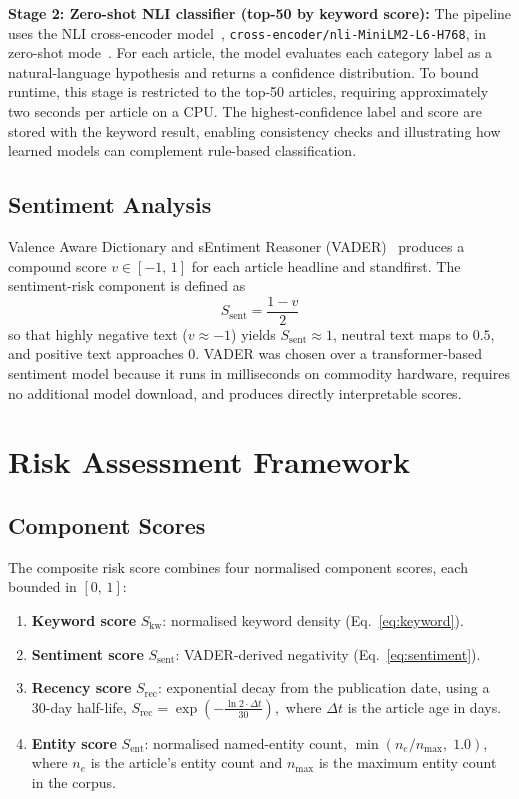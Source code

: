 \documentclass[12pt,lettersize,journal,onecolumn]{IEEEtran}
\begin{document}
\textbf{Stage 2: Zero-shot NLI classifier (top-50 by keyword score):} The pipeline uses the NLI cross-encoder model~\cite{reimers2019sentencebert}, \texttt{cross-encoder/nli-MiniLM2-L6-H768}, in zero-shot mode~\cite{yin2019benchmark}. For each article, the model evaluates each category label as a natural-language hypothesis and returns a confidence distribution. To bound runtime, this stage is restricted to the top-50 articles, requiring approximately two seconds per article on a CPU. The highest-confidence label and score are stored with the keyword result, enabling consistency checks and illustrating how learned models can complement rule-based classification.

\subsection{Sentiment Analysis}

Valence Aware Dictionary and sEntiment Reasoner (VADER)~\cite{hutto2014vader} produces a compound score $v \in [-1,\,1]$ for each article headline and standfirst. The sentiment-risk component is defined as
\begin{equation}
  S_{\mathrm{sent}} = \frac{1 - v}{2}
  \label{eq:sentiment}
\end{equation}
so that highly negative text ($v \approx -1$) yields $S_{\mathrm{sent}} \approx 1$, neutral text maps to $0.5$, and positive text approaches $0$. VADER was chosen over a transformer-based sentiment model because it runs in milliseconds on commodity hardware, requires no additional model download, and produces directly interpretable scores.

% 
\section{Risk Assessment Framework}
\label{sec:risk}
% 

\subsection{Component Scores}

The composite risk score combines four normalised component scores, each bounded in $[0,\,1]$:

\begin{enumerate}[leftmargin=*,noitemsep]
  \item \textbf{Keyword score} $S_{\mathrm{kw}}$: normalised keyword density (Eq.~\ref{eq:keyword}).
  \item \textbf{Sentiment score} $S_{\mathrm{sent}}$: VADER-derived negativity (Eq.~\ref{eq:sentiment}).
  \item \textbf{Recency score} $S_{\mathrm{rec}}$: exponential decay from the publication date, using a 30-day half-life, $S_{\mathrm{rec}} = \exp\!\left(-\frac{\ln 2 \cdot \Delta t}{30}\right),$ where $\Delta t$ is the article age in days.
  \item \textbf{Entity score} $S_{\mathrm{ent}}$: normalised named-entity count, $\min(n_e / n_{\max},\;1.0)$, where $n_e$ is the article's entity count and $n_{\max}$ is the maximum entity count in the corpus.
\end{enumerate}
\end{document}
